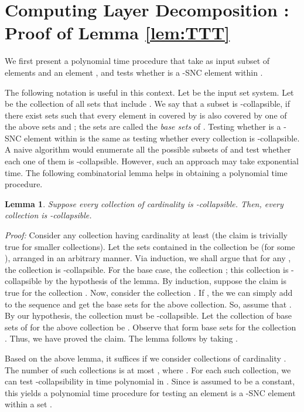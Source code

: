 \documentclass[11pt]{article}
\newtheorem{lemma}[theorem]{\bf Lemma}
\newcommand {\myproof} {{\it Proof: }}
\newcommand {\qed} {\hfill}
\begin{document}
\section{Computing Layer Decomposition : Proof of Lemma \ref{lem:TTT}}
\label{sec:layer-compute}
We first present a polynomial time procedure
that take as input subset of elements  and an element ,
and tests whether  is a -SNC element within .

The following notation is useful in this context.
Let  be the input set system.
Let  be the collection of all sets that include .
We say that a subset  is -collapsible, if
there exist  sets  such that
every element in  covered by  is also covered by one of the above  sets
and ; the  sets are called the {\em base sets} of .
Testing whether  is a -SNC element within  is the same as testing
whether every collection  is -collapsible.
A naive algorithm would enumerate all the possible subsets of  and test whether each one of them
is -collapsible. However, such an approach may take exponential time.
The following combinatorial lemma helps in obtaining a polynomial time procedure.

\begin{lemma}
\label{lem:SSS}
Suppose every collection  of cardinality  is -collapsible.
Then, every collection  is -collapsible.
\end{lemma}
\myproof
Consider any collection  having cardinality at least  
(the claim is trivially true for smaller collections). 
Let the sets contained in the collection be  (for some ), arranged
in an arbitrary manner.
Via induction, we shall argue that for any , the collection 
 is -collapsible.
For the base case, the collection 
; this collection is -collapsible by the hypothesis of the lemma.
By induction, suppose the claim is true for the collection .
Now, consider the collection .
If , the we can simply add  to the sequence 
and get the base sets for the above collection. So, assume that .
By our hypothesis, the collection  must be -collapsible.
Let the collection of base sets of for the above collection be .
Observe that  form base sets for the collection .
Thus, we have proved the claim. The lemma follows by taking .
\qed

Based on the above lemma, it suffices if we consider collections  of cardinality .
The number of such collections is at most , where . 
For each such collection, we can test -collapsibility 
in time polynomial in .
Since  is assumed to be a constant, 
this yields a polynomial time procedure for testing an element  is a -SNC element within a set .
\end{document}
